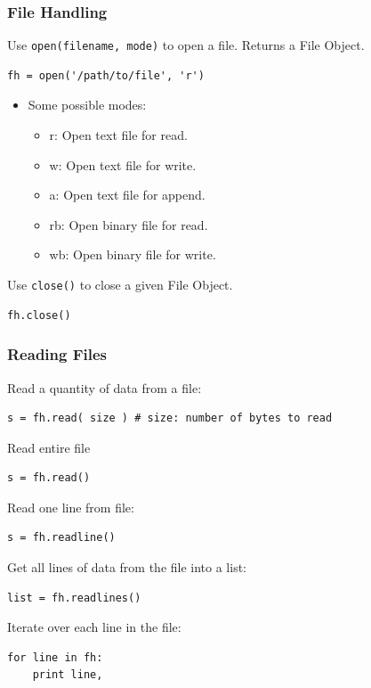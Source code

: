 \documentclass[t,10pt,compress=false,usepdftitle=false]{beamer}
\begin{document}
\begin{frame}[fragile]
    \frametitle{File Handling}
    Use \verb#open(filename, mode)# to open a file. Returns a File Object.
    \begin{myColorBox}{0.9}{}
\begin{verbatim}
fh = open('/path/to/file', 'r')
\end{verbatim}
    \end{myColorBox}
   \begin{itemize}
   \item Some possible modes:
   \begin{itemize}
        \item r: Open text file for read.
        \item w: Open text file for write.
        \item a: Open text file for append.
        \item rb: Open binary file for read.
        \item wb: Open binary file for write.
    \end{itemize}
    \end{itemize}
    Use \verb#close()# to close a given File Object.
    \begin{myColorBox}{0.9}{}
\begin{verbatim}
fh.close()
\end{verbatim}
    \end{myColorBox}
\end{frame}

\begin{frame}[fragile]
    \frametitle{Reading Files}
Read a quantity of data from a file:
    \begin{myColorBox}{0.9}{}
\begin{verbatim}
s = fh.read( size ) # size: number of bytes to read
\end{verbatim}
    \end{myColorBox}
\pause
Read entire file
    \begin{myColorBox}{0.9}{}
\begin{verbatim}
s = fh.read()
\end{verbatim}
    \end{myColorBox}
\pause
Read one line from file:
    \begin{myColorBox}{0.9}{}
\begin{verbatim}
s = fh.readline()
\end{verbatim}
    \end{myColorBox}
\pause
Get all lines of data from the file into a list:
    \begin{myColorBox}{0.9}{}
\begin{verbatim}
list = fh.readlines()
\end{verbatim}
    \end{myColorBox}
\pause
Iterate over each line in the file:
    \begin{myColorBox}{0.9}{}
\begin{verbatim}
for line in fh:
    print line,
\end{verbatim}
    \end{myColorBox}
\end{frame}
\end{document}
